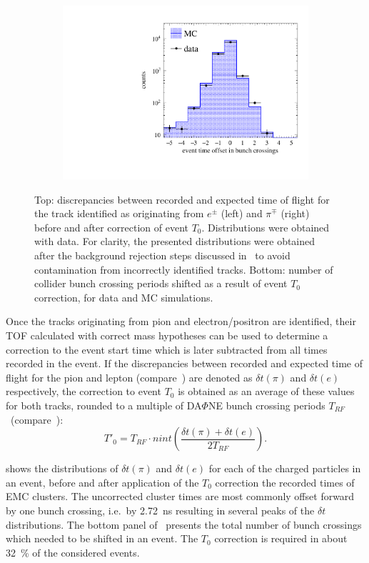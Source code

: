\begin{figure}[b]
\begin{subfigure}{0.45\textwidth}
  {\includegraphics[width=1.0\textwidth]{Chapter7_analysis_kloe/img/t0_bunches}}
\end{subfigure}
  \caption{Top: discrepancies between recorded and expected time of flight for the track identified as originating from $e^{\pm}$ (left) and $\pi^{\mp}$ (right) before and after correction of event $T_0$. Distributions were obtained with data. For clarity, the  presented distributions were obtained after the background rejection steps discussed in~ to avoid contamination from incorrectly identified tracks. Bottom: number of collider bunch crossing periods shifted as a result of event $T_0$ correction, for data and MC simulations.}\label{fig:t0_corr}
\end{figure}

Once the tracks originating from pion and electron/positron are identified, their TOF calculated with correct mass hypotheses can be used to determine a correction to the event start time which is later subtracted from all times recorded in the event. If the discrepancies between recorded and expected time of flight for the pion and lepton (compare~) are denoted as $\delta t(\pi)$ and $\delta t(e)$ respectively, the correction to event $T_0$ is obtained as an average of these values for both tracks, rounded to a multiple of DA$\Phi$NE bunch crossing periods $T_{RF}$~(compare~):
\begin{equation}
  \label{eq:t0_correction_semil}
  T'_{0} = T_{RF}\cdot nint\left(\frac{\delta t(\pi) + \delta t(e)}{2T_{RF}}\right).
\end{equation}

 shows the distributions of $\delta t(\pi)$ and $\delta t(e)$ for each of the charged particles in an event, before and after application of the $T_0$ correction the recorded times of EMC clusters. The uncorrected cluster times are most commonly offset forward by one bunch crossing, i.e.\ by 2.72~ns resulting in several peaks of the $\delta t$ distributions. The bottom panel of~ presents the total number of bunch crossings which needed to be shifted in an event. The $T_0$ correction is required in about \SI{32}{\percent} of the considered events.


